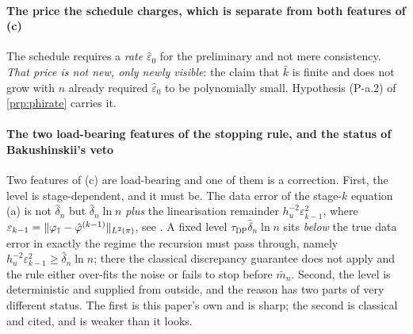 \paragraph{The price the schedule charges, which is separate from both features of \textup{(c)}}

The schedule requires a \emph{rate} $\hat\varepsilon_0$ for the preliminary and not mere consistency.
\emph{That price is not new, only newly visible}: the claim that $\bar k$ is finite and does not grow
with $n$ already required $\hat\varepsilon_0$ to be polynomially small. Hypothesis (P-a.2) of
\cref{prp:phirate} carries it.

\paragraph{The two load-bearing features of the stopping rule, and the status of Bakushinskii's veto}

Two features of (c) are load-bearing and one of them is a correction. First, the level is
stage-dependent, and it must be. The data error of the stage-$k$ equation (a) is not $\hat\delta_n$
but $\hat\delta_n\ln n$ \emph{plus} the linearisation remainder $h_u^{-2}\varepsilon_{k-1}^{2}$, where
$\varepsilon_{k-1}=\|\varphi_{\dagger}-\hat\varphi^{(k-1)}\|_{L^{2}(\pi)}$, see . A
fixed level $\tau_{\mathrm{DP}}\hat\delta_n\ln n$ sits
\emph{below} the true data error in exactly the regime the recursion must pass through, namely
$h_u^{-2}\varepsilon_{k-1}^{2}\ge\hat\delta_n\ln n$; there the classical discrepancy guarantee does not
apply and the rule either over-fits the noise or fails to stop before $\bar m_n$.
Second, the level is deterministic and supplied from outside, and the reason has two parts of
very different status. The first is this paper's own and is sharp; the second is classical and cited,
and is weaker than it looks.

